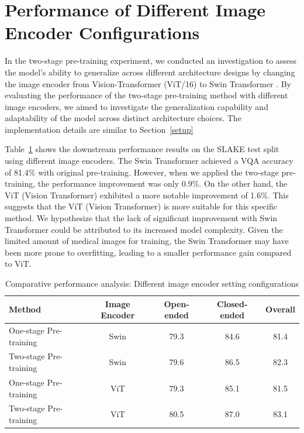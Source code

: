 \section{Performance of Different Image Encoder Configurations}\label{expDiffImgEnc}
In the two-stage pre-training experiment, we conducted an investigation to assess the model's ability to generalize across different architecture designs by changing the image encoder from Vision-Transformer (ViT/16) \cite{dosovitskiy2020vit} to Swin Transformer \cite{Liu_2021_ICCV}. By evaluating the performance of the two-stage pre-training method with different image encoders, we aimed to investigate the generalization capability and adaptability of the model across distinct architecture choices. The implementation details are similar to Section~\ref{setup}

Table~\ref{tab:diffImageEncoder} shows the downstream performance results on the SLAKE test split using different image encoders. The Swin Transformer achieved a VQA accuracy of 81.4\% with original pre-training. However, when we applied the two-stage pre-training, the performance improvement was only 0.9\%. On the other hand, the ViT (Vision Transformer) exhibited a more notable improvement of 1.6\%. This suggests that the ViT (Vision Transformer) is more suitable for this specific method. We hypothesize that the lack of significant improvement with Swin Transformer could be attributed to its increased model complexity. Given the limited amount of medical images for training, the Swin Transformer may have been more prone to overfitting, leading to a smaller performance gain compared to ViT.

\begin{table}[h]
    \centering
    \caption{Comparative performance analysis: Different image encoder setting configurations}
    \setlength{\tabcolsep}{3.pt}
    \begin{tabular}{l c c c c}
        \toprule
        Method & Image Encoder & Open-ended & Closed-ended & Overall  \\
        \midrule
        One-stage Pre-training & Swin & 79.3 & 84.6 & 81.4 \\
        Two-stage Pre-training & Swin & 79.6 & 86.5 & 82.3 \\
        One-stage Pre-training & ViT & 79.3 & 85.1 & 81.5 \\
        \rowcolor{LightCyan}
        Two-stage Pre-training & ViT & 80.5 & 87.0 & 83.1 \\
        \bottomrule
    \end{tabular}
    \label{tab:diffImageEncoder}
\end{table}

